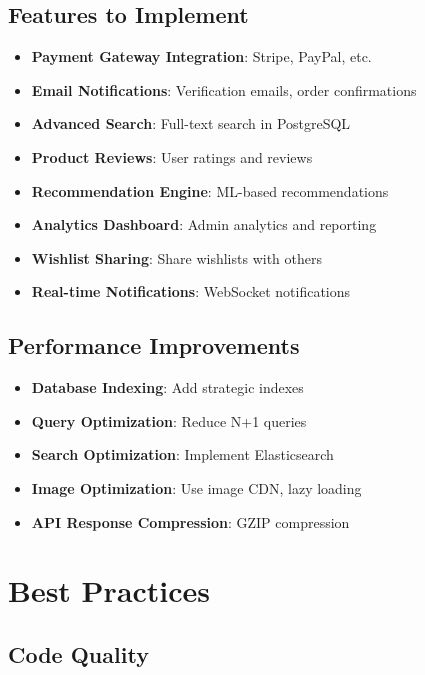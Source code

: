 \documentclass[12pt,a4paper]{report}
\begin{document}
\subsection{Features to Implement}

\begin{itemize}
    \item \textbf{Payment Gateway Integration}: Stripe, PayPal, etc.
    \item \textbf{Email Notifications}: Verification emails, order confirmations
    \item \textbf{Advanced Search}: Full-text search in PostgreSQL
    \item \textbf{Product Reviews}: User ratings and reviews
    \item \textbf{Recommendation Engine}: ML-based recommendations
    \item \textbf{Analytics Dashboard}: Admin analytics and reporting
    \item \textbf{Wishlist Sharing}: Share wishlists with others
    \item \textbf{Real-time Notifications}: WebSocket notifications
\end{itemize}

\subsection{Performance Improvements}

\begin{itemize}
    \item \textbf{Database Indexing}: Add strategic indexes
    \item \textbf{Query Optimization}: Reduce N+1 queries
    \item \textbf{Search Optimization}: Implement Elasticsearch
    \item \textbf{Image Optimization}: Use image CDN, lazy loading
    \item \textbf{API Response Compression}: GZIP compression
\end{itemize}

\section{Best Practices}

\subsection{Code Quality}
\end{document}
